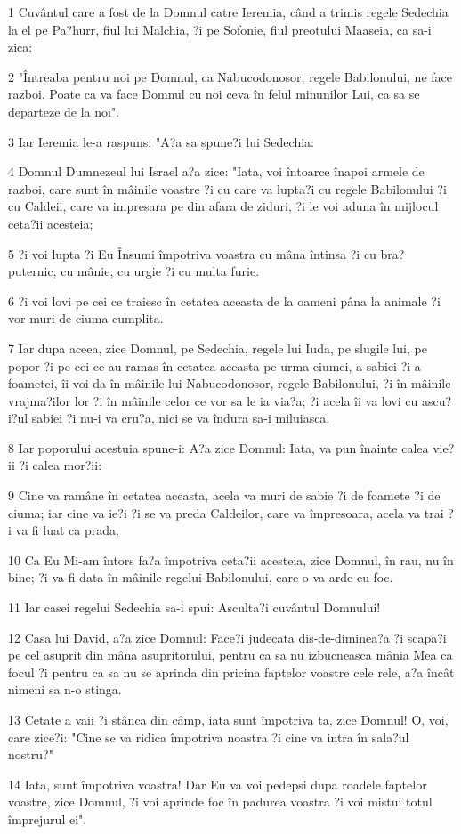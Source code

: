 \par 1 Cuvântul care a fost de la Domnul catre Ieremia, când a trimis regele Sedechia la el pe Pa?hurr, fiul lui Malchia, ?i pe Sofonie, fiul preotului Maaseia, ca sa-i zica:
\par 2 "Întreaba pentru noi pe Domnul, ca Nabucodonosor, regele Babilonului, ne face razboi. Poate ca va face Domnul cu noi ceva în felul minunilor Lui, ca sa se departeze de la noi".
\par 3 Iar Ieremia le-a raspuns: "A?a sa spune?i lui Sedechia:
\par 4 Domnul Dumnezeul lui Israel a?a zice: "Iata, voi întoarce înapoi armele de razboi, care sunt în mâinile voastre ?i cu care va lupta?i cu regele Babilonului ?i cu Caldeii, care va impresara pe din afara de ziduri, ?i le voi aduna în mijlocul ceta?ii acesteia;
\par 5 ?i voi lupta ?i Eu Însumi împotriva voastra cu mâna întinsa ?i cu bra? puternic, cu mânie, cu urgie ?i cu multa furie.
\par 6 ?i voi lovi pe cei ce traiesc în cetatea aceasta de la oameni pâna la animale ?i vor muri de ciuma cumplita.
\par 7 Iar dupa aceea, zice Domnul, pe Sedechia, regele lui Iuda, pe slugile lui, pe popor ?i pe cei ce au ramas în cetatea aceasta pe urma ciumei, a sabiei ?i a foametei, îi voi da în mâinile lui Nabucodonosor, regele Babilonului, ?i în mâinile vrajma?ilor lor ?i în mâinile celor ce vor sa le ia via?a; ?i acela îi va lovi cu ascu?i?ul sabiei ?i nu-i va cru?a, nici se va îndura sa-i miluiasca.
\par 8 Iar poporului acestuia spune-i: A?a zice Domnul: Iata, va pun înainte calea vie?ii ?i calea mor?ii:
\par 9 Cine va ramâne în cetatea aceasta, acela va muri de sabie ?i de foamete ?i de ciuma; iar cine va ie?i ?i se va preda Caldeilor, care va împresoara, acela va trai ?i va fi luat ca prada,
\par 10 Ca Eu Mi-am întors fa?a împotriva ceta?ii acesteia, zice Domnul, în rau, nu în bine; ?i va fi data în mâinile regelui Babilonului, care o va arde cu foc.
\par 11 Iar casei regelui Sedechia sa-i spui: Asculta?i cuvântul Domnului!
\par 12 Casa lui David, a?a zice Domnul: Face?i judecata dis-de-diminea?a ?i scapa?i pe cel asuprit din mâna asupritorului, pentru ca sa nu izbucneasca mânia Mea ca focul ?i pentru ca sa nu se aprinda din pricina faptelor voastre cele rele, a?a încât nimeni sa n-o stinga.
\par 13 Cetate a vaii ?i stânca din câmp, iata sunt împotriva ta, zice Domnul! O, voi, care zice?i: "Cine se va ridica împotriva noastra ?i cine va intra în sala?ul nostru?"
\par 14 Iata, sunt împotriva voastra! Dar Eu va voi pedepsi dupa roadele faptelor voastre, zice Domnul, ?i voi aprinde foc în padurea voastra ?i voi mistui totul împrejurul ei".

